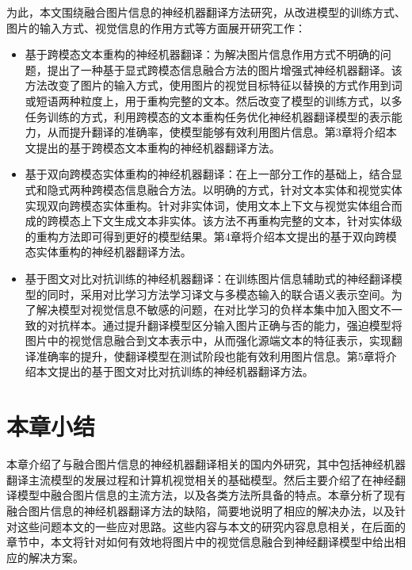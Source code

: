 为此，本文围绕融合图片信息的神经机器翻译方法研究，从改进模型的训练方式、图片的输入方式、视觉信息的作用方式等方面展开研究工作：
\begin{itemize}
    \item {\sffamily 基于跨模态文本重构的神经机器翻译：}为解决图片信息作用方式不明确的问题，提出了一种基于显式跨模态信息融合方法的图片增强式神经机器翻译。该方法改变了图片的输入方式，使用图片的视觉目标特征以替换的方式作用到词或短语两种粒度上，用于重构完整的文本。然后改变了模型的训练方式，以多任务训练的方式，利用跨模态的文本重构任务优化神经机器翻译模型的表示能力，从而提升翻译的准确率，使模型能够有效利用图片信息。第3章将介绍本文提出的基于跨模态文本重构的神经机器翻译方法。
    \item {\sffamily 基于双向跨模态实体重构的神经机器翻译：}在上一部分工作的基础上，结合显式和隐式两种跨模态信息融合方法。以明确的方式，针对文本实体和视觉实体实现双向跨模态实体重构。针对非实体词，使用文本上下文与视觉实体组合而成的跨模态上下文生成文本非实体。该方法不再重构完整的文本，针对实体级的重构方法即可得到更好的模型结果。第4章将介绍本文提出的基于双向跨模态实体重构的神经机器翻译方法。
    \item {\sffamily 基于图文对比对抗训练的神经机器翻译：}在训练图片信息辅助式的神经翻译模型的同时，采用对比学习方法学习译文与多模态输入的联合语义表示空间。为了解决模型对视觉信息不敏感的问题，在对比学习的负样本集中加入图文不一致的对抗样本。通过提升翻译模型区分输入图片正确与否的能力，强迫模型将图片中的视觉信息融合到文本表示中，从而强化源端文本的特征表示，实现翻译准确率的提升，使翻译模型在测试阶段也能有效利用图片信息。第5章将介绍本文提出的基于图文对比对抗训练的神经机器翻译方法。
\end{itemize}



\section{本章小结}
本章介绍了与融合图片信息的神经机器翻译相关的国内外研究，其中包括神经机器翻译主流模型的发展过程和计算机视觉相关的基础模型。然后主要介绍了在神经翻译模型中融合图片信息的主流方法，以及各类方法所具备的特点。本章分析了现有融合图片信息的神经机器翻译方法的缺陷，简要地说明了相应的解决办法，以及针对这些问题本文的一些应对思路。这些内容与本文的研究内容息息相关，在后面的章节中，本文将针对如何有效地将图片中的视觉信息融合到神经翻译模型中给出相应的解决方案。

